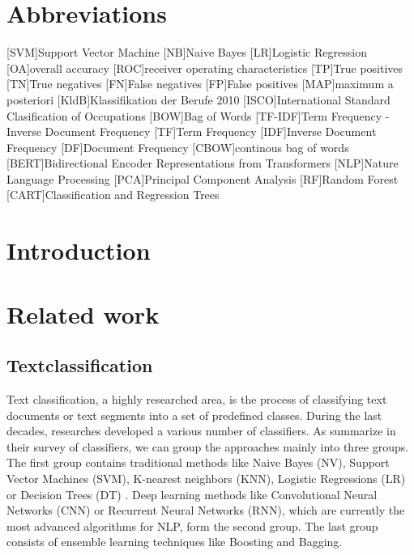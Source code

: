\documentclass[12pt, a4paper, titlepage]{article}
\begin{document}
\section*{Abbreviations}
\begin{acronym}
  [SVM]{Support Vector Machine}
  [NB]{Naive Bayes}
  [LR]{Logistic Regression}
  [OA]{overall accuracy}
  [ROC]{receiver operating characteristics}
  [TP]{True positives}
  [TN]{True negatives}
  [FN]{False negatives}
  [FP]{False positives}
  [MAP]{maximum a posteriori}
  [KldB]{Klassifikation der Berufe 2010}
  [ISCO]{International Standard Clasification of Occupations}
  [BOW]{Bag of Words}
  [TF-IDF]{Term Frequency - Inverse Document Frequency}
  [TF]{Term Frequency}
  [IDF]{Inverse Document Frequency}
  [DF]{Document Frequency}
  [CBOW]{continous bag of words}
  [BERT]{Bidirectional Encoder  Representations from Transformers}
  [NLP]{Nature Language Processing}
  [PCA]{Principal Component Analysis}
  [RF]{Random Forest}
  [CART]{Classification and Regression Trees}
\end{acronym}
\newpage

\section{Introduction}
\section{Related work}
\subsection{Textclassification}
Text classification, a highly researched area, is the process of classifying text documents or text segments into a set of predefined classes. During the last decades, researches developed a various number of classifiers. As \cite{Kowsari2019} summarize in their survey of classifiers, we can group the approaches mainly into three groups. The first group contains traditional methods like Naive Bayes (NV), Support Vector Machines (SVM), K-nearest neighbors (KNN),  Logistic Regressions (LR) or Decision Trees (DT) \citep{Vijayan2017, Colas2006, Kowsari2019, Sebastiani2001}. Deep learning methods like Convolutional Neural Networks (CNN) or Recurrent Neural Networks (RNN), which are currently the most advanced algorithms for NLP, form the second group. The last group consists of ensemble learning techniques like Boosting and Bagging.
\end{document}
